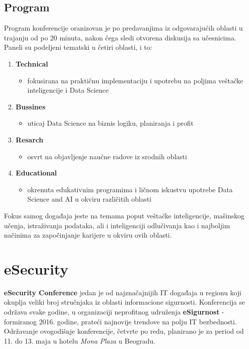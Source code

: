 \documentclass[a4paper]{article}
\begin{document}
\subsection{Program}
Program konferencije oranizovan je po predavanjima iz odgovarajućih oblasti u trajanju od po 20 minuta, nakon čega sledi otvorena diskusija sa učesnicima.
\newline
\newline
Paneli su podeljeni tematski u četiri oblasti, i to:
\begin{enumerate}
    \item \textbf{Technical}
    \begin{itemize}
        \item fokusirana na praktičnu implementaciju i upotrebu na poljima veštačke inteligencije i Data Science
    \end{itemize}
     \item \textbf{Bussines}
    \begin{itemize}
        \item uticaj Data Science na biznis logiku, planiranja i profit
    \end{itemize}
     \item \textbf{Resarch}
    \begin{itemize}
        \item osvrt na objavljenje naučne radove iz srodnih oblasti
    \end{itemize}
     \item \textbf{Educational}
    \begin{itemize}
        \item okrenuta edukativnim programima i ličnom iskustvu upotrebe Data Science and AI u okviru različitih oblasti
    \end{itemize}
\end{enumerate}

Fokus samog događaja jeste na temama poput veštačke inteligencije, mašinskog učenja, istraživanja podataka, ali i inteligenciji odlučivanja kao i najboljim načinima za započinjanje karijere u okviru ovih oblasti.


\section{eSecurity}
\textbf{eSecurity Conference} jedan je od najznačajnijih IT događaja u regionu koji okuplja veliki broj stručnjaka iz oblasti informacione sigurnosti. Konferencija se održava svake godine, u organizaciji neprofitnog udruženja \textbf{eSigurnost} - formiranog 2016. godine, prateći najnovije trendove na polju IT bezbednosti. Održavanje ovogodišnje konferencije, četvrte po redu, planirano je za period od 11. do 13. maja u hotelu \textit{Mona Plaza} u Beogradu.
\end{document}
